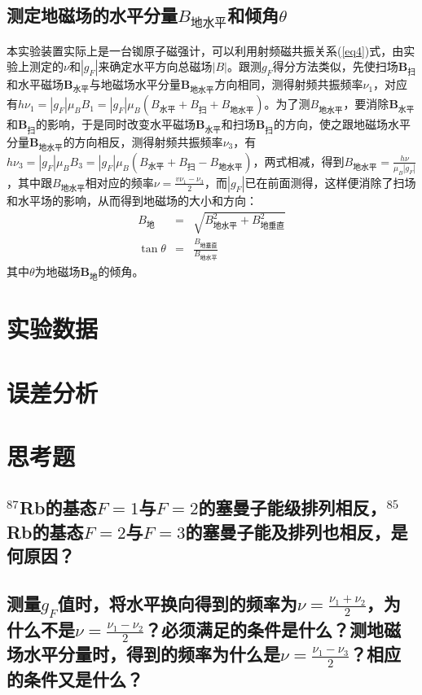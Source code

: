 \documentclass[a4paper]{article}
\begin{document}
\subsection{测定地磁场的水平分量$B_{\text{地水平}}$和倾角$\theta$}
本实验装置实际上是一台铷原子磁强计，可以利用射频磁共振关系(\ref{eq4})式，由实验上测定的$\nu$和$|g_F|$来确定水平方向总磁场$|B|$。跟测$g_F$得分方法类似，先使扫场$\bm{B}_{\text{扫}}$和水平磁场$\bm{B}_{\text{水平}}$与地磁场水平分量$\bm{B}_{\text{地水平}}$方向相同，测得射频共振频率$\nu_1$，对应有$h\nu_1 = |g_F|\mu_BB_1 = |g_F|\mu_B(B_{\text{水平}} + B_{\text{扫}} + B_{\text{地水平}})$。为了测$B_{\text{地水平}}$，要消除$\bm{B}_{\text{水平}}$和$\bm{B}_{\text{扫}}$的影响，于是同时改变水平磁场$\bm{B}_{\text{水平}}$和扫场$\bm{B}_{\text{扫}}$的方向，使之跟地磁场水平分量$\bm{B}_{\text{地水平}}$的方向相反，测得射频共振频率$\nu_3$，有$h\nu_3 = |g_F|\mu_BB_3 = |g_F|\mu_B(B_{\text{水平}} + B_{\text{扫}} - B_{\text{地水平}})$，两式相减，得到$B_{\text{地水平}} = \frac{h\nu}{\mu_B|g_F|}$，其中跟$B_{\text{地水平}}$相对应的频率$\nu = \frac{v\nu_1 - \nu_3}{2}$，而$|g_F|$已在前面测得，这样便消除了扫场和水平场的影响，从而得到地磁场的大小和方向：
\begin{eqnarray}
B_{\text{地}} &=& \sqrt{B^2_{\text{地水平}} + B^2_{\text{地垂直}}}\label{eq7}\\
\tan\theta &=& \frac{B_{\text{地垂直}}}{B_{\text{地水平}}}\label{eq8}
\end{eqnarray}
其中$\theta$为地磁场$\bm{B}_{\text{地}}$的倾角。

\section{实验数据}

\section{误差分析}

\section{思考题}
\subsection{$^{87}$Rb的基态$F=1$与$F=2$的塞曼子能级排列相反，$^{85}$Rb的基态$F=2$与$F=3$的塞曼子能及排列也相反，是何原因？}
\subsection{测量$g_F$值时，将水平换向得到的频率为$\nu = \frac{\nu_1+\nu_2}{2}$，为什么不是$\nu = \frac{\nu_1-\nu_2}{2}$？必须满足的条件是什么？测地磁场水平分量时，得到的频率为什么是$\nu = \frac{\nu_1-\nu_3}{2}$？相应的条件又是什么？}
\end{document}
